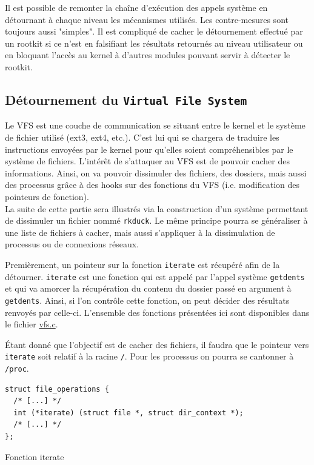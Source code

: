 \documentclass[12pt]{article}
\begin{document}
        Il est possible de remonter la chaîne d'exécution des appels système en détournant à chaque niveau les mécanismes utilisés. Les contre-mesures sont toujours aussi "simples". Il est compliqué de cacher le détournement effectué par un rootkit si ce n'est en falsifiant les résultats retournés au niveau utilisateur ou en bloquant l'accès au kernel à d'autres modules pouvant servir à détecter le rootkit.

    \subsection{Détournement du \texttt{Virtual File System}}
    \label{sec:vfs}
    
        Le VFS est une couche de communication se situant entre le kernel et le système de fichier utilisé (ext3, ext4, etc.). C'est lui qui se chargera de traduire les instructions envoyées par le kernel pour qu'elles soient compréhensibles par le système de fichiers.
        L'intérêt de s'attaquer au VFS est de pouvoir cacher des informations. Ainsi, on va pouvoir dissimuler des fichiers, des dossiers, mais aussi des processus grâce à des hooks sur des fonctions du VFS (i.e. modification des pointeurs de fonction). \\

        La suite de cette partie sera illustrés via la construction d'un système permettant de dissimuler un fichier nommé \texttt{rkduck}. Le même principe pourra se généraliser à une liste de fichiers à cacher, mais aussi s'appliquer à la dissimulation de processus ou de connexions réseaux. 

        Premièrement, un pointeur sur la fonction \texttt{iterate} est récupéré afin de la détourner. \texttt{iterate} est une fonction qui est appelé par l'appel système \texttt{getdents} et qui va amorcer la récupération du contenu du dossier passé en argument à \texttt{getdents}. Ainsi, si l'on contrôle cette fonction, on peut décider des résultats renvoyés par celle-ci. L'ensemble des fonctions présentées ici sont disponibles dans le fichier \href{https://github.com/QuokkaLight/rkduck/blob/master/rkduck/vfs.c}{vfs.c}.

        Étant donné que l'objectif est de cacher des fichiers, il faudra que le pointeur vers \texttt{iterate} soit relatif à la racine \texttt{/}. Pour les processus on pourra se cantonner à \texttt{/proc}. \\

\begin{listing}[H]
\begin{verbatim}
struct file_operations {
  /* [...] */
  int (*iterate) (struct file *, struct dir_context *);
  /* [...] */
};
\end{verbatim}
\caption{Fonction iterate}
\label{listing:5}
\end{listing}
\end{document}
